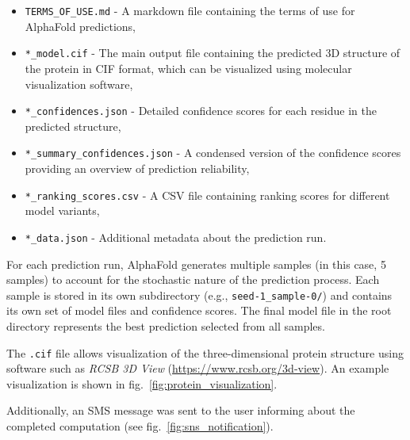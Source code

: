 \begin{itemize}
    \item \texttt{TERMS\_OF\_USE.md} - A markdown file containing the terms of use for AlphaFold predictions,
    \item \texttt{*\_model.cif} - The main output file containing the predicted 3D structure of the protein in CIF format, which can be visualized using molecular visualization software,
    \item \texttt{*\_confidences.json} - Detailed confidence scores for each residue in the predicted structure,
    \item \texttt{*\_summary\_confidences.json} - A condensed version of the confidence scores providing an overview of prediction reliability,
    \item \texttt{*\_ranking\_scores.csv} - A CSV file containing ranking scores for different model variants,
    \item \texttt{*\_data.json} - Additional metadata about the prediction run.
\end{itemize}

For each prediction run, AlphaFold generates multiple samples (in this case, 5 samples) to account for the stochastic nature of the prediction process.
Each sample is stored in its own subdirectory (e.g., \texttt{seed-1\_sample-0/}) and contains its own set of model files and confidence scores.
The final model file in the root directory represents the best prediction selected from all samples.

The \texttt{.cif} file allows visualization of the three-dimensional protein structure using software such as \textit{RCSB 3D View} (\url{https://www.rcsb.org/3d-view}).
An example visualization is shown in fig.~\ref{fig:protein_visualization}.

Additionally, an SMS message was sent to the user informing about the completed computation (see fig.~\ref{fig:sns_notification}).

